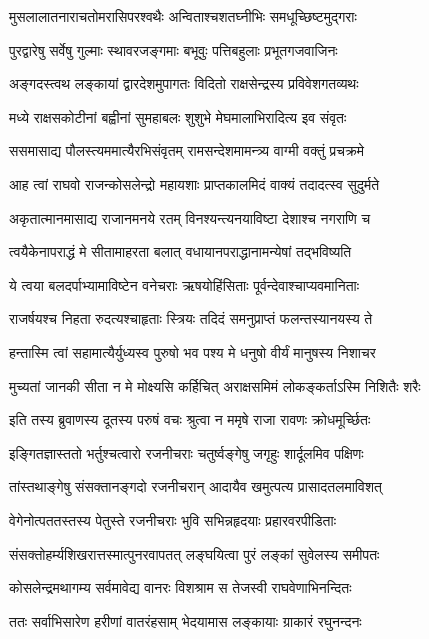 \twolineshloka
{मुसलालातनाराचतोमरासिपरश्वथैः}
{अन्विताश्चशतघ्नीभिः समधूच्छिष्टमुद्गराः}


\twolineshloka
{पुरद्वारेषु सर्वेषु गुल्माः स्थावरजङ्गमाः}
{बभूवुः पत्तिबहुलाः प्रभूतगजवाजिनः}


\twolineshloka
{अङ्गदस्त्वथ लङ्कायां द्वारदेशमुपागतः}
{विदितो राक्षसेन्द्रस्य प्रविवेशगतव्यथः}


\twolineshloka
{मध्ये राक्षसकोटीनां बह्वीनां सुमहाबलः}
{शुशुभे मेघमालाभिरादित्य इव संवृतः}


\twolineshloka
{ससमासाद्य पौलस्त्यममात्यैरभिसंवृतम्}
{रामसन्देशमामन्त्र्य वाग्मी वक्तुं प्रचक्रमे}


\twolineshloka
{आह त्वां राघवो राजन्कोसलेन्द्रो महायशाः}
{प्राप्तकालमिदं वाक्यं तदादत्स्व सुदुर्मते}


\twolineshloka
{अकृतात्मानमासाद्य राजानमनये रतम्}
{विनश्यन्त्यनयाविष्टा देशाश्च नगराणि च}


\twolineshloka
{त्वयैकेनापराद्धं मे सीतामाहरता बलात्}
{वधायानपराद्धानामन्येषां तद्भविष्यति}


\twolineshloka
{ये त्वया बलदर्पाभ्यामाविष्टेन वनेचराः}
{ऋषयोहिंसिताः पूर्वन्देवाश्चाप्यवमानिताः}


\twolineshloka
{राजर्षयश्च निहता रुदत्यश्चाहृताः स्त्रियः}
{तदिदं समनुप्राप्तं फलन्तस्यानयस्य ते}


\twolineshloka
{हन्तास्मि त्वां सहामात्यैर्युध्यस्व पुरुषो भव}
{पश्य मे धनुषो वीर्यं मानुषस्य निशाचर}


\twolineshloka
{मुच्यतां जानकी सीता न मे मोक्ष्यसि कर्हिचित्}
{अराक्षसमिमं लोकङ्कर्ताऽस्मि निशितैः शरैः}


\twolineshloka
{इति तस्य ब्रुवाणस्य दूतस्य परुषं वचः}
{श्रुत्वा न ममृषे राजा रावणः क्रोधमूर्च्छितः}


\twolineshloka
{इङ्गितज्ञास्ततो भर्तुश्चत्वारो रजनीचराः}
{चतुर्ष्वङ्गेषु जगृहुः शार्दूलमिव पक्षिणः}


\twolineshloka
{तांस्तथाङ्गेषु संसक्तानङ्गदो रजनीचरान्}
{आदायैव खमुत्पत्य प्रासादतलमाविशत्}


\twolineshloka
{वेगेनोत्पततस्तस्य पेतुस्ते रजनीचराः}
{भुवि सभिन्नहृदयाः प्रहारवरपीडिताः}


\twolineshloka
{संसक्तोहर्म्यशिखरात्तस्मात्पुनरवापतत्}
{लङ्घयित्वा पुरं लङ्कां सुवेलस्य समीपतः}


\twolineshloka
{कोसलेन्द्रमथागम्य सर्वमावेद्य वानरः}
{विशश्राम स तेजस्वी राघवेणाभिनन्दितः}


\twolineshloka
{ततः सर्वाभिसारेण हरीणां वातरंहसाम्}
{भेदयामास लङ्कायाः ग्राकारं रघुनन्दनः}


